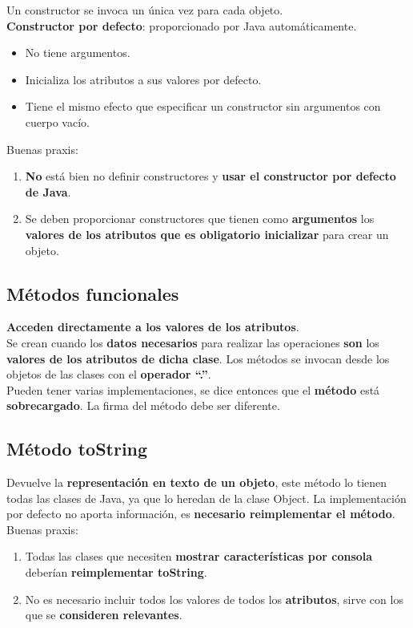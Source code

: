 \documentclass{article}
\begin{document}
Un constructor se invoca un única vez para cada objeto. \\

\textbf{Constructor por defecto}: proporcionado por Java automáticamente.
\begin{itemize}
    \item No tiene argumentos.
    \item Inicializa los atributos a sus valores por defecto.
    \item Tiene el mismo efecto que especificar un constructor sin argumentos con cuerpo vacío.
\end{itemize}

Buenas praxis:
\begin{enumerate}
    \item \textbf{No} está bien no definir constructores y \textbf{usar el constructor por defecto de Java}.
    \item Se deben proporcionar constructores que tienen como \textbf{argumentos} los \textbf{valores de los atributos que es obligatorio inicializar} para crear un objeto.
\end{enumerate}

\subsection{Métodos funcionales}
\textbf{Acceden directamente a los valores de los atributos}. \\
Se crean cuando los \textbf{datos necesarios} para realizar las operaciones \textbf{son} los \textbf{valores de los atributos de dicha clase}. Los métodos se invocan desde los objetos de las clases con el \textbf{operador “.”}. \\
Pueden tener varias implementaciones, se dice entonces que el \textbf{método} está \textbf{sobrecargado}. La firma del método debe ser diferente.

\subsection{Método toString}
Devuelve la \textbf{representación en texto de un objeto}, este método lo tienen todas las clases de Java, ya que lo heredan de la clase Object. La implementación por defecto no aporta información, es \textbf{necesario reimplementar el método}. \\

Buenas praxis:
\begin{enumerate}
    \item Todas las clases que necesiten \textbf{mostrar características por consola} deberían \textbf{reimplementar toString}.
    \item No es necesario incluir todos los valores de todos los \textbf{atributos}, sirve con los que se \textbf{consideren relevantes}.
\end{enumerate}
\end{document}

